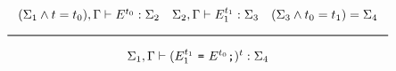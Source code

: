 \[
  \Rule{(\Sigma_1 \wedge t = t_0), \Gamma \vdash E^{t_0} : \Sigma_2 \quad \Sigma_2, \Gamma \vdash E_1^{t_1} : \Sigma_3 \quad (\Sigma_3 \wedge t_0 = t_1) = \Sigma_4 }{
    \Sigma_1, \Gamma \vdash (E_1^{t_1} \ \texttt{=} \ E^{t_0} \texttt{;})^{t} : \Sigma_4}  
\]






